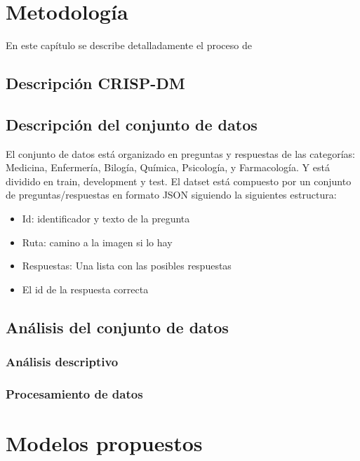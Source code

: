 \chapter{Metodología}\label{chapter:methods}

En este capítulo se describe detalladamente el proceso de


\section{Descripción CRISP-DM}

\section{Descripción del conjunto de datos}

El conjunto de datos está organizado en preguntas y respuestas de las categorías: Medicina, Enfermería, Bilogía, Química, Psicología, y Farmacología. Y está dividido en train, development y test. El datset está compuesto por un conjunto de preguntas/respuestas en formato JSON siguiendo la siguientes estructura:

\begin{itemize}
  \item Id: identificador y texto de la pregunta
  \item Ruta: camino a la imagen si lo hay
  \item Respuestas: Una lista con las posibles respuestas
  \item El id de la respuesta correcta
\end{itemize}


\section{Análisis del conjunto de datos}

\subsection{Análisis descriptivo}

\subsection{Procesamiento de datos}


\chapter{Modelos propuestos}\label{chapter:models}

